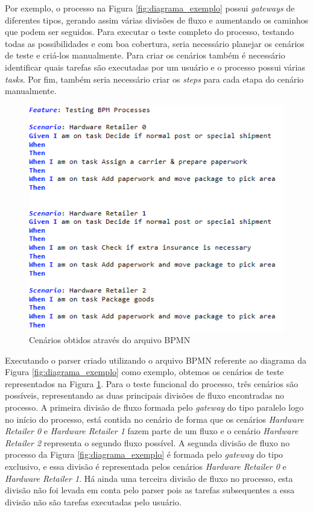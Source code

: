 \documentclass[12pt]{article}
\begin{document}
Por exemplo, o processo na Figura \ref{fig:diagrama_exemplo} possui \emph{gateways} de diferentes tipos, gerando assim várias divisões de fluxo e aumentando os caminhos que podem ser seguidos. Para executar o teste completo do processo, testando todas as possibilidades e com boa cobertura, seria necessário planejar os cenários de teste e criá-los manualmente. Para criar os cenários também é necessário identificar quais tarefas são executadas por um usuário e o processo possui várias \emph{tasks}. Por fim, também seria necessário criar os \emph{steps} para cada etapa do cenário manualmente.

\begin{figure}[ht]
\includegraphics[width=.8\paperwidth]{figuras/cenario_resultado.png}
\caption{Cenários obtidos através do arquivo BPMN}
\label{fig:cenario_resultado}
\end{figure}

Executando o parser criado utilizando o arquivo BPMN referente ao diagrama da Figura \ref{fig:diagrama_exemplo} como exemplo, obtemos os cenários de teste representados na Figura \ref{fig:cenario_resultado}. Para o teste funcional do processo, três cenários são possíveis, representando as duas principais divisões de fluxo encontradas no processo. A primeira divisão de fluxo formada pelo \emph{gateway} do tipo paralelo logo no início do processo, está contida no cenário de forma que os cenários \emph{Hardware Retailer 0} e \emph{Hardware Retailer 1} fazem parte de um fluxo e o cenário \emph{Hardware Retailer 2} representa o segundo fluxo possível. A segunda divisão de fluxo no processo da Figura \ref{fig:diagrama_exemplo} é formada pelo \emph{gateway} do tipo exclusivo, e essa divisão é representada pelos cenários \emph{Hardware Retailer 0} e \emph{Hardware Retailer 1}. Há ainda uma terceira divisão de fluxo no processo, esta divisão não foi levada em conta pelo parser pois as tarefas subsequentes a essa divisão não são tarefas executadas pelo usuário.
\end{document}
